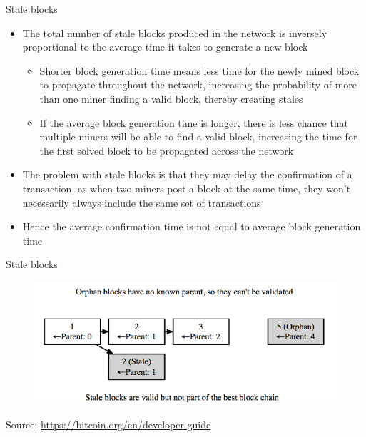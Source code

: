 \documentclass[9pt]{beamer}
\begin{document}
\begin{frame}{Stale blocks}
	\begin{itemize}
		\item The total number of stale blocks produced in the network is inversely proportional to the average time it takes to generate a new block
		\begin{itemize}
			\item Shorter block generation time means less time for the newly mined block to propagate throughout the network, increasing the probability of more than one miner finding a valid block, thereby creating stales
			\item If the average block generation time is longer, there is less chance that multiple miners will be able to find a valid block, increasing the time for the first solved block to be propagated across the network
		\end{itemize}
		\item The problem with stale blocks is that they may delay the confirmation of a transaction, as when two miners post a block at the same time, they won't necessarily always include the same set of transactions
		\item Hence the average confirmation time is not equal to average block generation time
	\end{itemize}
\end{frame}


\begin{frame}{Stale blocks}
	\begin{figure}[]
		\centering
		\includegraphics  [scale=0.4]{Images/stale}
	\end{figure}
	\begin{tiny}
		Source: \href{https://bitcoin.org/en/developer-guide}{https://bitcoin.org/en/developer-guide}
	\end{tiny}
\end{frame}
\end{document}
